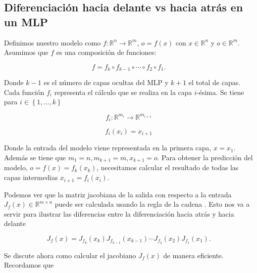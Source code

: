 \subsection{Diferenciación hacia delante vs hacia atrás en un MLP}


Definimos nuestro modelo como $f: \mathbb{R}^n \rightarrow \mathbb{R}^m$, $o=f(x)$ con $x \in \mathbb{R}^n$  y $o \in \mathbb{R}^m$. Asumimos que $f$ es una composición de funciones:

$$f=f_k \circ f_{k-1} \circ \cdots \circ f_2 \circ f_1.$$

Donde $k-1$ es el número de capas ocultas del MLP y $k+1$ el total de capas. Cada función $f_i$ representa el cálculo que se realiza en la capa $i$-ésima. Se tiene para $i \in \left \{ 1,\ldots,k \right \}$


$$f_i: \mathbb{R}^{m_i} \rightarrow \mathbb{R}^{m_{i+1}}$$

$$f_i(x_i)=x_{i+1}$$

Donde la entrada del modelo viene representada en la primera capa, $x=x_1$. Además se tiene que $m_1=n, m_{k+1}=m, x_{k+1}=o$. Para obtener la predicción del modelo, $o=f(x)=f_k(x_k)$, necesitamos calcular el resultado de todas las capas intermedias $x_{i+1}=f_i(x_i)$. 

Podemos ver que la matriz jacobiana de la salida con respecto a la entrada $J_f(x) \in  \mathbb{R}^{m\times n}$ puede ser calculada usando la regla de la cadena . Esto nos va a servir para ilustrar las diferencias entre la diferenciación hacia atrás y hacia delante


\begin{equation*}
	J_f(x) = J_{f_k}(x_k) J_{f_{k-1}}(x_{k-1}) \cdots J_{f_2}(x_2) J_{f_1}(x_1).
\end{equation*}



Se discute ahora como calcular el jacobiano $J_f(x)$ de manera eficiente. Recordamos que 

